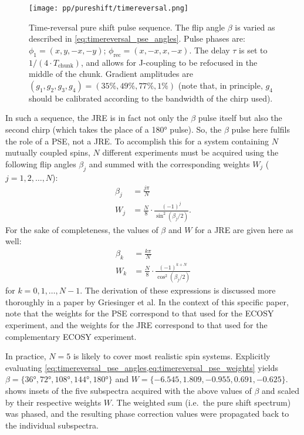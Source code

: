 \begin{figure}[htb]
    \centering
    \texttt{[image: pp/pureshift/timereversal.png]}%
    \caption[Time-reversal pure shift pulse sequence]{
        Time-reversal pure shift pulse sequence.
        The flip angle $\beta$ is varied as described in \cref{eq:timereversal_pse_angles}.
        Pulse phases are: $\phi_1 = (x, y, -x, -y)$; $\phi_\text{rec} = (x, -x, x, -x)$.
        The delay $\tau$ is set to $1/(4 \cdot T_\text{chunk})$, and allows for J-coupling to be refocused in the middle of the chunk.
        Gradient amplitudes are $(g_1, g_2, g_3, g_4) = (35\%, 49\%, 77\%, 1\%)$ (note that, in principle, $g_4$ should be calibrated according to the bandwidth of the chirp used).
    }
    \label{fig:timereversal_pulseq}
\end{figure}

In such a sequence, the JRE is in fact not only the $\beta$ pulse itself but also the second chirp (which takes the place of a \ang{180} pulse).
So, the $\beta$ pulse here fulfils the role of a PSE, not a JRE.
To accomplish this for a system containing $N$ mutually coupled spins, $N$ different experiments must be acquired using the following flip angles $\beta_j$ and summed with the corresponding weights $W_j$ ($j = 1, 2, \ldots, N$):
\begin{align}
    \beta_j &= \frac{j\pi}{N} \label{eq:timereversal_pse_angles} \\
    W_j &= \frac{N}{8}\cdot \frac{(-1)^j}{\sin^2(\beta_j/2)} \label{eq:timereversal_pse_weights}.
\end{align}
For the sake of completeness, the values of $\beta$ and $W$ for a JRE are given here as well:
\begin{align}
    \beta_k &= \frac{k\pi}{N} \label{eq:timereversal_jre_angles} \\
    W_k &= \frac{N}{8}\cdot \frac{(-1)^{k + N}}{\cos^2(\beta_j/2)} \label{eq:timereversal_jre_weights}
\end{align}
for $k = 0, 1, \ldots, N-1$.
The derivation of these expressions is discussed more thoroughly in a paper by Griesinger et al.\autocite{Griesinger1986JCP}
In the context of this specific paper, note that the weights for the PSE correspond to that used for the ECOSY experiment, and the weights for the JRE correspond to that used for the complementary ECOSY experiment.

In practice, $N = 5$ is likely to cover most realistic spin systems.
Explicitly evaluating \cref{eq:timereversal_pse_angles,eq:timereversal_pse_weights} yields $\beta = \{\ang{36}, \ang{72}, \ang{108}, \ang{144}, \ang{180}\}$ and $W = \{−6.545,1.809,−0.955,0.691,−0.625\}$.
 shows insets of the five subspectra acquired with the above values of $\beta$ and scaled by their respective weights $W$.
The weighted sum (i.e.\ the pure shift spectrum) was phased, and the resulting phase correction values were propagated back to the individual subspectra.

